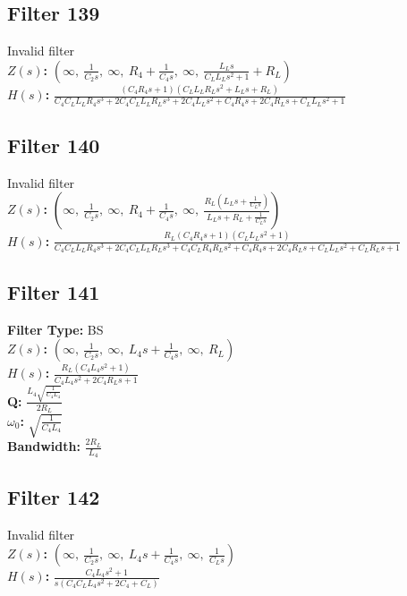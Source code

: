 \documentclass{article}
\begin{document}
\subsection*{Filter 139}
Invalid filter \\ 
\textbf{$Z(s)$:} $\left( \infty, \  \frac{1}{C_{2} s}, \  \infty, \  R_{4} + \frac{1}{C_{4} s}, \  \infty, \  \frac{L_{L} s}{C_{L} L_{L} s^{2} + 1} + R_{L}\right)$ \\ 
\textbf{$H(s)$:} $\frac{\left(C_{4} R_{4} s + 1\right) \left(C_{L} L_{L} R_{L} s^{2} + L_{L} s + R_{L}\right)}{C_{4} C_{L} L_{L} R_{4} s^{3} + 2 C_{4} C_{L} L_{L} R_{L} s^{3} + 2 C_{4} L_{L} s^{2} + C_{4} R_{4} s + 2 C_{4} R_{L} s + C_{L} L_{L} s^{2} + 1}$ \\ 
\subsection*{Filter 140}
Invalid filter \\ 
\textbf{$Z(s)$:} $\left( \infty, \  \frac{1}{C_{2} s}, \  \infty, \  R_{4} + \frac{1}{C_{4} s}, \  \infty, \  \frac{R_{L} \left(L_{L} s + \frac{1}{C_{L} s}\right)}{L_{L} s + R_{L} + \frac{1}{C_{L} s}}\right)$ \\ 
\textbf{$H(s)$:} $\frac{R_{L} \left(C_{4} R_{4} s + 1\right) \left(C_{L} L_{L} s^{2} + 1\right)}{C_{4} C_{L} L_{L} R_{4} s^{3} + 2 C_{4} C_{L} L_{L} R_{L} s^{3} + C_{4} C_{L} R_{4} R_{L} s^{2} + C_{4} R_{4} s + 2 C_{4} R_{L} s + C_{L} L_{L} s^{2} + C_{L} R_{L} s + 1}$ \\ 
\subsection*{Filter 141}
\textbf{Filter Type:} BS \\ 
\textbf{$Z(s)$:} $\left( \infty, \  \frac{1}{C_{2} s}, \  \infty, \  L_{4} s + \frac{1}{C_{4} s}, \  \infty, \  R_{L}\right)$ \\ 
\textbf{$H(s)$:} $\frac{R_{L} \left(C_{4} L_{4} s^{2} + 1\right)}{C_{4} L_{4} s^{2} + 2 C_{4} R_{L} s + 1}$ \\ 
\textbf{Q:} $\frac{L_{4} \sqrt{\frac{1}{C_{4} L_{4}}}}{2 R_{L}}$ \\ 
\textbf{$\omega_0$:} $\sqrt{\frac{1}{C_{4} L_{4}}}$ \\ 
\textbf{Bandwidth:} $\frac{2 R_{L}}{L_{4}}$ \\ 
\subsection*{Filter 142}
Invalid filter \\ 
\textbf{$Z(s)$:} $\left( \infty, \  \frac{1}{C_{2} s}, \  \infty, \  L_{4} s + \frac{1}{C_{4} s}, \  \infty, \  \frac{1}{C_{L} s}\right)$ \\ 
\textbf{$H(s)$:} $\frac{C_{4} L_{4} s^{2} + 1}{s \left(C_{4} C_{L} L_{4} s^{2} + 2 C_{4} + C_{L}\right)}$ \\ 
\end{document}
